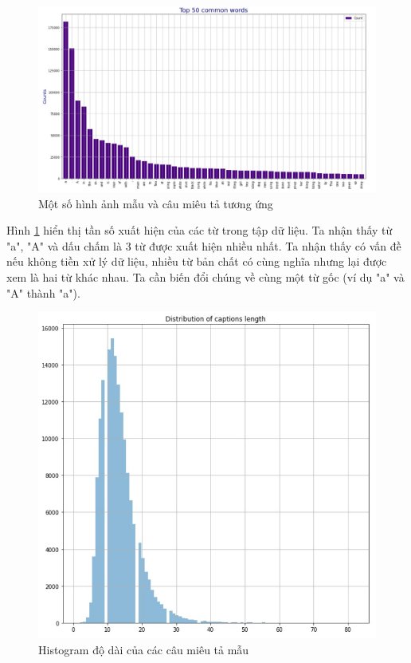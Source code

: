\documentclass[14pt, a4paper]{article}
\numberwithin{equation}{section}
\numberwithin{algorithm}{section}
\numberwithin{figure}{section}
\numberwithin{table}{section}
\numberwithin{dl}{section}
\numberwithin{md}{section}
\numberwithin{bd}{section}
\numberwithin{dn}{section}
\numberwithin{hq}{section}
\begin{document}
    
    \begin{figure}[h!] \centering

        \includegraphics[scale=0.5]{Flickr_frequency_raw_word.jpg}
        \caption{Một số hình ảnh mẫu và câu miêu tả tương ứng}
        \label{fig:Flickr_frequency_raw_word}

    \end{figure}

    Hình \ref{fig:Flickr_frequency_raw_word} hiển thị tần số xuất hiện của các từ trong tập dữ liệu. Ta nhận thấy từ "a", "A" và dấu chấm là 3 từ được xuất hiện nhiều nhất.
    Ta nhận thấy có vấn đề nếu không tiền xử lý dữ liệu, nhiều từ bản chất có cùng nghĩa nhưng lại được xem là hai từ khác nhau. Ta cần biến đổi chúng về cùng một từ gốc (ví dụ "a" và "A" thành "a").

    \begin{figure}[h!] \centering

        \includegraphics[scale=0.5]{Flickr_Length_Distribution.jpg}
        \caption{Histogram độ dài của các câu miêu tả mẫu}
        \label{fig:Flickr_Length_Distribution}

    \end{figure}
\end{document}

